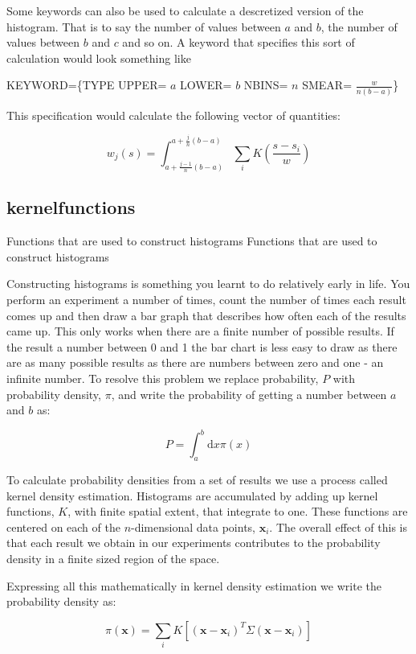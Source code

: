 Some keywords can also be used to calculate a descretized version of the histogram. That is to say the number of values between $a$ and $b$, the number of values between $b$ and $c$ and so on. A keyword that specifies this sort of calculation would look something like

K\+E\+Y\+W\+O\+R\+D=\{T\+Y\+P\+E U\+P\+P\+E\+R= $a$ L\+O\+W\+E\+R= $b$ N\+B\+I\+N\+S= $n$ S\+M\+E\+A\+R= $\frac{w}{n(b-a)}$\}

This specification would calculate the following vector of quantities\+:

\[ w_j(s) = \int_{a + \frac{j-1}{n}(b-a)}^{a + \frac{j}{n}(b-a)} \sum_i K\left( \frac{s - s_i}{w} \right) \] \hypertarget{kernelfunctions}{}\subsection{kernelfunctions}\label{kernelfunctions}
Functions that are used to construct histograms Functions that are used to construct histograms 

Constructing histograms is something you learnt to do relatively early in life. You perform an experiment a number of times, count the number of times each result comes up and then draw a bar graph that describes how often each of the results came up. This only works when there are a finite number of possible results. If the result a number between 0 and 1 the bar chart is less easy to draw as there are as many possible results as there are numbers between zero and one -\/ an infinite number. To resolve this problem we replace probability, $P$ with probability density, $\pi$, and write the probability of getting a number between $a$ and $b$ as\+:

\[ P = \int_{a}^b \textrm{d}x \pi(x) \]

To calculate probability densities from a set of results we use a process called kernel density estimation. Histograms are accumulated by adding up kernel functions, $K$, with finite spatial extent, that integrate to one. These functions are centered on each of the $n$-\/dimensional data points, $\mathbf{x}_i$. The overall effect of this is that each result we obtain in our experiments contributes to the probability density in a finite sized region of the space.

Expressing all this mathematically in kernel density estimation we write the probability density as\+:

\[ \pi(\mathbf{x}) = \sum_i K\left[ (\mathbf{x} - \mathbf{x}_i)^T \Sigma (\mathbf{x} - \mathbf{x}_i) \right] \]

